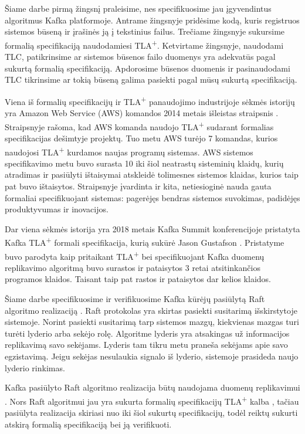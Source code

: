 \documentclass{VUMIFPSmagistrinis}
\begin{document}
		Šiame darbe pirmą žingsnį praleisime, nes specifikuosime jau įgyvendintus algoritmus Kafka platformoje.
		Antrame žingsnyje pridėsime kodą, kuris registruos sistemos būseną ir įrašinės ją į tekstinius failus.
		Trečiame žingsnyje sukursime formalią specifikaciją naudodamiesi TLA\textsuperscript{+}.
		Ketvirtame žingsnyje, naudodami TLC, patikrinsime ar sistemos būsenos failo duomenys yra adekvatūs pagal sukurtą formalią specifikaciją. Apdorosime būsenos duomenis ir pasinaudodami TLC tikrinsime ar tokią būseną galima pasiekti pagal mūsų sukurtą specifikaciją.


		Viena iš formalių specifikacijų ir TLA\textsuperscript{+} panaudojimo industrijoje sėkmės istorijų yra Amazon Web Service (AWS) komandos 2014 metais išleistas straipsnis \cite{newcombe2014use}.
		Straipsnyje rašoma,  kad AWS komanda naudojo TLA\textsuperscript{+} sudarant formalias specifikacijas dešimtyje projektų. Tuo metu AWS turėjo 7 komandas, kurios naudojosi TLA\textsuperscript{+} kurdamos naujas programų sistemas.
		AWS sistemos specifikavimo metu buvo surasta 10 iki šiol neatrastų sisteminių klaidų, kurių atradimas ir pasiūlyti ištaisymai atskleidė tolimesnes sistemos klaidas, kurios taip pat buvo ištaisytos.
		Straipsnyje įvardinta ir kita, netiesioginė nauda gauta formaliai specifikuojant sistemas: pagerėjęs bendras sistemos suvokimas, padidėjęs produktyvumas ir inovacijos.
		

		Dar viena sėkmės istorija yra 2018 metais Kafka Summit konferencijoje pristatyta Kafka TLA\textsuperscript{+} formali specifikacija, kurią sukūrė Jason Gustafson \cite{kfkTla}.
		Pristatyme buvo parodyta kaip pritaikant TLA\textsuperscript{+} bei specifikuojant Kafka duomenų replikavimo algoritmą buvo surastos ir pataisytos 3 retai atsitinkančios programos klaidos.
		Taisant taip pat rastos ir pataisytos dar kelios klaidos.


		Šiame darbe specifikuosime ir verifikuosime Kafka kūrėjų pasiūlytą Raft algoritmo \cite{10.1145/2723872.2723876} realizaciją \cite{raftimpl}.
		Raft protokolas yra skirtas pasiekti susitarimą išskirstytoje sistemoje.
		Norint pasiekti susitarimą tarp sistemos mazgų, kiekvienas mazgas turi turėti lyderio arba sekėjo rolę.
		Algoritme lyderis yra atsakingas už informacijos replikavimą savo sekėjams.
		Lyderis tam tikru metu praneša sekėjams apie savo egzistavimą.
		Jeigu sekėjas nesulaukia signalo iš lyderio, sistemoje prasideda naujo lyderio rinkimas.
		
		
		Kafka pasiūlyto Raft algoritmo realizacija būtų naudojama duomenų replikavimui \cite{raftimpl}.
		Nors Raft algoritmui jau yra sukurta formalių specifikacijų TLA\textsuperscript{+} kalba \cite{rafttla}, tačiau pasiūlyta realizacija skiriasi nuo iki šiol sukurtų specifikacijų, todėl reiktų sukurti atskirą formalią specifikaciją bei ją verifikuoti.
\end{document}
